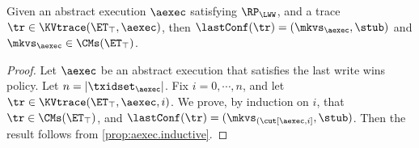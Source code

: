 \begin{proposition}
\label{prop:aexec2kvtrace}
Given an abstract execution $\aexec$ satisfying $\RP_{\LWW}$, 
and a trace $\tr \in \KVtrace(\ET_{\top}, \aexec)$,
then $\lastConf(\tr) = (\mkvs_{\aexec}, \stub)$ and $\mkvs_{\aexec} \in \CMs(\ET_{\top})$. 
\end{proposition}
\begin{proof}
Let $\aexec$ be an abstract execution that satisfies the last write wins policy. 
Let $n = \lvert \txidset_{\aexec} \rvert$. Fix $i =0,\cdots, n$, 
and let $\tr \in \KVtrace(\ET_{\top}, \aexec, i)$. We prove, by 
induction on $i$, that $\tr \in \CMs(\ET_{\top})$, and 
$\lastConf(\tr) = (\mkvs_{(\cut[\aexec, i]}, \stub)$. 
Then the result follows from  \cref{prop:aexec.inductive}.


\end{proof}
